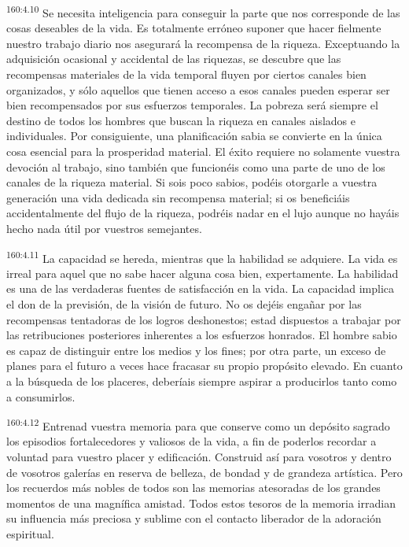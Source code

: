 \par
\textsuperscript{160:4.10} Se necesita inteligencia para conseguir la parte que nos corresponde de las cosas deseables de la vida. Es totalmente erróneo suponer que hacer fielmente nuestro trabajo diario nos asegurará la recompensa de la riqueza. Exceptuando la adquisición ocasional y accidental de las riquezas, se descubre que las recompensas materiales de la vida temporal fluyen por ciertos canales bien organizados, y sólo aquellos que tienen acceso a esos canales pueden esperar ser bien recompensados por sus esfuerzos temporales. La pobreza será siempre el destino de todos los hombres que buscan la riqueza en canales aislados e individuales. Por consiguiente, una planificación sabia se convierte en la única cosa esencial para la prosperidad material. El éxito requiere no solamente vuestra devoción al trabajo, sino también que funcionéis como una parte de uno de los canales de la riqueza material. Si sois poco sabios, podéis otorgarle a vuestra generación una vida dedicada sin recompensa material; si os beneficiáis accidentalmente del flujo de la riqueza, podréis nadar en el lujo aunque no hayáis hecho nada útil por vuestros semejantes.

\par
\textsuperscript{160:4.11} La capacidad se hereda, mientras que la habilidad se adquiere. La vida es irreal para aquel que no sabe hacer alguna cosa bien, expertamente. La habilidad es una de las verdaderas fuentes de satisfacción en la vida. La capacidad implica el don de la previsión, de la visión de futuro. No os dejéis engañar por las recompensas tentadoras de los logros deshonestos; estad dispuestos a trabajar por las retribuciones posteriores inherentes a los esfuerzos honrados. El hombre sabio es capaz de distinguir entre los medios y los fines; por otra parte, un exceso de planes para el futuro a veces hace fracasar su propio propósito elevado. En cuanto a la búsqueda de los placeres, deberíais siempre aspirar a producirlos tanto como a consumirlos.

\par
\textsuperscript{160:4.12} Entrenad vuestra memoria para que conserve como un depósito sagrado los episodios fortalecedores y valiosos de la vida, a fin de poderlos recordar a voluntad para vuestro placer y edificación. Construid así para vosotros y dentro de vosotros galerías en reserva de belleza, de bondad y de grandeza artística. Pero los recuerdos más nobles de todos son las memorias atesoradas de los grandes momentos de una magnífica amistad. Todos estos tesoros de la memoria irradian su influencia más preciosa y sublime con el contacto liberador de la adoración espiritual.

